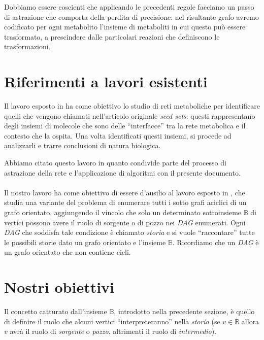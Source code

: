 Dobbiamo essere coscienti che applicando le precedenti regole facciamo
un passo di astrazione che comporta della perdita di precisione: nel
risultante grafo avremo codificato per ogni metabolito l'insieme di
metaboliti in cui questo pu\`o essere trasformato, a prescindere dalle
particolari reazioni che definiscono le trasformazioni.

\section{Riferimenti a lavori esistenti}
Il lavoro esposto in \cite{large-scale-reconstruction} ha come
obiettivo lo studio di reti metaboliche per identificare quelli che
vengono chiamati nell'articolo originale \emph{seed sets}: questi
rappresentano degli insiemi di molecole che sono delle ``interfacce''
tra la rete metabolica e il contesto che la ospita. Una volta
identificati questi insiemi, si procede ad analizzarli e trarre
conclusioni di natura biologica.

Abbiamo citato questo lavoro in quanto condivide parte del processo di
astrazione della rete e l'applicazione di algoritmi con il presente
documento.
\\\\
Il nostro lavoro ha come obiettivo di essere d'ausilio al lavoro
esposto in \cite{tellingStories}, che studia una variante del problema
di enumerare tutti i sotto grafi aciclici di un grafo orientato,
aggiungendo il vincolo che solo un determinato sottoinsieme
$\mathbb{B}$ di vertici possono avere il ruolo di sorgente o di pozzo
nei \emph{DAG} enumerati. Ogni \emph{DAG} che soddisfa tale condizione
\`e chiamato \emph{storia} e si vuole ``raccontare'' tutte le
possibili storie dato un grafo orientato e l'insieme
$\mathbb{B}$. Ricordiamo che un \emph{DAG} \`e un grafo orientato che
non contiene cicli.

\section{Nostri obiettivi}
Il concetto catturato dall'insieme $\mathbb{B}$, introdotto nella
precedente sezione, \`e quello di definire il ruolo che alcuni vertici
``interpreteranno'' nella \emph{storia} (se $v \in \mathbb{B}$ allora
$v$ avr\`a il ruolo di \emph{sorgente} o \emph{pozzo}, altrimenti il
ruolo di \emph{intermedio}).

